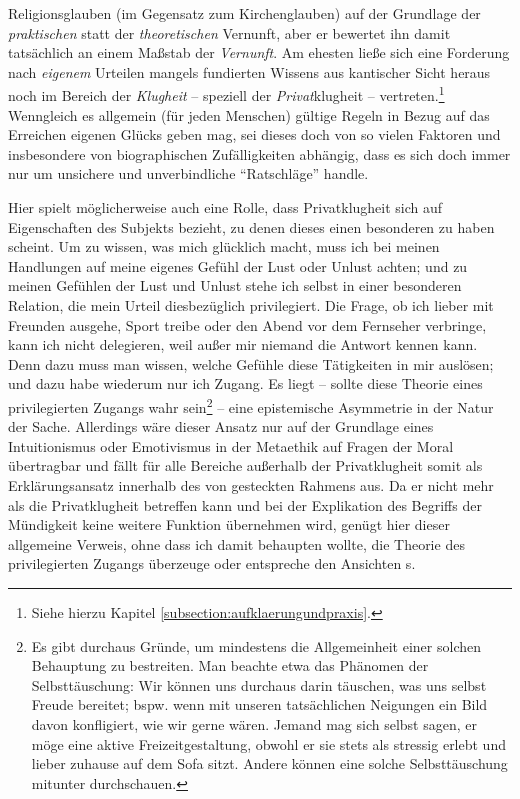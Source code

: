 \begin{nummerierung}
Religionsglauben (im Gegensatz zum Kirchenglauben) auf der Grundlage der
\emph{praktischen} statt der \emph{theoretischen} Vernunft, aber er bewertet ihn
damit tatsächlich an einem Maßstab der \emph{Vernunft}. Am ehesten ließe sich
eine Forderung nach \emph{eigenem} Urteilen mangels fundierten Wissens aus
kantischer Sicht heraus noch im Bereich der \emph{Klugheit} --
speziell der \emph{Privat}klugheit -- vertreten.\footnote{Siehe hierzu Kapitel
\ref{subsection:aufklaerungundpraxis}.} Wenngleich es allgemein (für jeden
Menschen) gültige Regeln in Bezug auf das Erreichen eigenen Glücks geben mag,
sei dieses doch von so vielen Faktoren und insbesondere von biographischen
Zufälligkeiten abhängig, dass es sich doch immer nur um unsichere und
unverbindliche \enquote{Ratschläge} handle.

Hier spielt möglicherweise auch eine Rolle, dass Privatklugheit sich auf
Eigenschaften des Subjekts bezieht, zu denen dieses einen besonderen
 zu haben scheint. Um zu wissen, was mich
glücklich macht, muss ich bei meinen Handlungen auf meine eigenes Gefühl der
Lust oder Unlust achten; und zu meinen Gefühlen der Lust und Unlust stehe ich
selbst in einer besonderen Relation, die mein Urteil diesbezüglich privilegiert.
Die Frage, ob ich lieber mit Freunden ausgehe, Sport treibe oder den Abend vor
dem Fernseher verbringe, kann ich nicht delegieren, weil außer mir niemand die
Antwort kennen kann. Denn dazu muss man wissen, welche Gefühle diese Tätigkeiten
in mir auslösen; und dazu habe wiederum nur ich Zugang. Es liegt -- sollte diese
Theorie eines privilegierten Zugangs wahr sein\footnote{Es gibt durchaus Gründe,
um mindestens die Allgemeinheit einer solchen Behauptung zu bestreiten. Man
beachte etwa das Phänomen der Selbsttäuschung: Wir können uns durchaus darin
täuschen, was uns selbst Freude bereitet; bspw.
wenn mit unseren tatsächlichen Neigungen ein Bild davon konfligiert, wie wir
gerne wären. Jemand mag sich selbst sagen, er möge eine aktive
Freizeitgestaltung, obwohl er sie stets als stressig erlebt und lieber zuhause
auf dem Sofa sitzt. Andere können eine solche Selbsttäuschung mitunter
durchschauen.} -- eine epistemische Asymmetrie in der Natur der Sache.
Allerdings wäre dieser Ansatz nur auf der Grundlage eines Intuitionismus oder
Emotivismus in der Metaethik auf Fragen der Moral
übertragbar und fällt für alle Bereiche außerhalb der Privatklugheit somit als
Erklärungsansatz innerhalb des von  gesteckten Rahmens aus.
Da er nicht mehr als die Privatklugheit betreffen kann und bei der Explikation
des Begriffs der Mündigkeit keine weitere Funktion übernehmen wird, genügt hier
dieser allgemeine Verweis, ohne dass ich damit behaupten wollte, die Theorie
des privilegierten Zugangs überzeuge oder entspreche den Ansichten
s.


\end{nummerierung}
